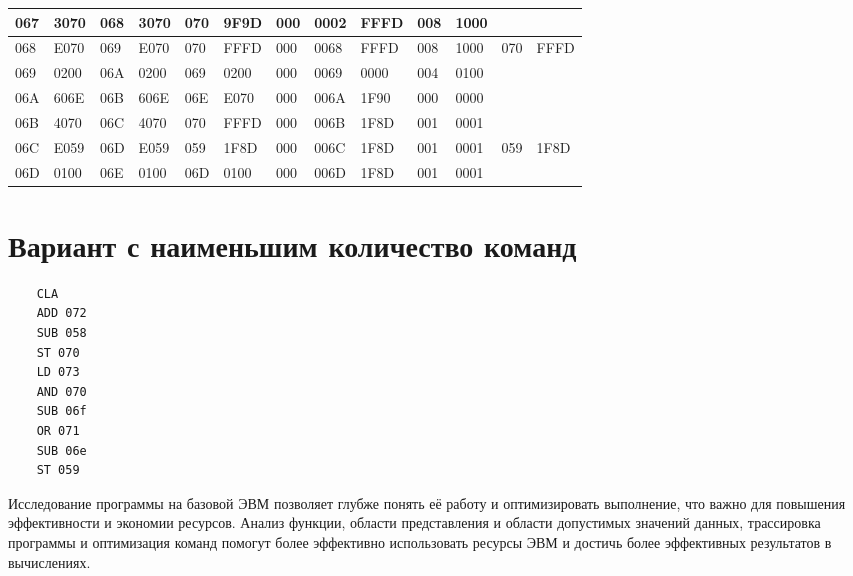 \documentclass[14pt]{extreport}
\begin{document}
\begin{landscape}
\begin{table}[!h]
\begin{tabular}{|l|l|l|l|l|l|l|l|l|l|l|l|l|}
                    067 & 3070 & 068 & 3070 & 070 & 9F9D & 000 & 0002 & FFFD & 008 & 1000 & ~ & ~ \\ \hline
                    068 & E070 & 069 & E070 & 070 & FFFD & 000 & 0068 & FFFD & 008 & 1000 & 070 & FFFD \\ \hline
                    069 & 0200 & 06A & 0200 & 069 & 0200 & 000 & 0069 & 0000 & 004 & 0100 & ~ & ~ \\ \hline
                    06A & 606E & 06B & 606E & 06E & E070 & 000 & 006A & 1F90 & 000 & 0000 & ~ & ~ \\ \hline
                    06B & 4070 & 06C & 4070 & 070 & FFFD & 000 & 006B & 1F8D & 001 & 0001 & ~ & ~ \\ \hline
                    06C & E059 & 06D & E059 & 059 & 1F8D & 000 & 006C & 1F8D & 001 & 0001 & 059 & 1F8D \\ \hline
                    06D & 0100 & 06E & 0100 & 06D & 0100 & 000 & 006D & 1F8D & 001 & 0001 & ~ & ~ \\ \hline
                \end{tabular}
            \end{table}
        \end{landscape}

    \chapter{Вариант с наименьшим количество команд}
    \begin{verbatim}
    CLA
    ADD 072
    SUB 058
    ST 070
    LD 073
    AND 070
    SUB 06f
    OR 071
    SUB 06e
    ST 059
        \end{verbatim}
    \conclusions

        Исследование программы на базовой ЭВМ позволяет глубже понять её работу и оптимизировать выполнение, что важно для повышения эффективности и экономии ресурсов. Анализ функции, области представления и области допустимых значений данных, трассировка программы и оптимизация команд помогут более эффективно использовать ресурсы ЭВМ и достичь более эффективных результатов в вычислениях.
\end{document}
